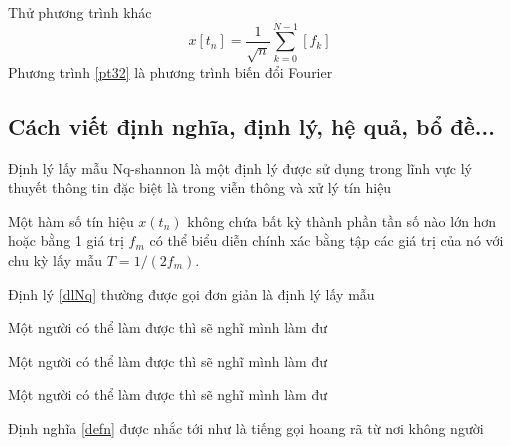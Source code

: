 Thử phương trình khác 
\begin{equation}
    \label{pt32}
    x[t_n] = \frac{1}{\sqrt{n}} \sum_{k=0}^{N-1}[f_k]
\end{equation}
Phương trình \ref{pt32} là phương trình biến đổi Fourier
\subsection{Cách viết định nghĩa, định lý, hệ quả, bổ đề...}
Định lý lấy mẫu Nq-shannon là một định lý được sử dụng trong lĩnh vực lý thuyết thông tin đặc biệt là trong viễn thông và xử lý tín hiệu 
\begin{theorem} %
    \label{dlNq}
    Một hàm số tín hiệu  $x(t_n)$ không chứa bất kỳ thành phần tần số nào lớn hơn hoặc bằng 1 giá trị $f_m$ có thể biểu diễn chính xác bằng tập các giá trị của nó với chu kỳ lấy mẫu $T = 1/(2f_m)$.
\end{theorem}
Định lý \ref{dlNq} thường được gọi đơn giản là định lý lấy mẫu 
\begin{corollary}
    Một người có thể làm được thì sẽ nghĩ mình làm đư
\end{corollary}
\begin{lemma}
    Một người có thể làm được thì sẽ nghĩ mình làm đư
\end{lemma}
\begin{defn}
    \label{defn}
    Một người có thể làm được thì sẽ nghĩ mình làm đư
\end{defn}
Định nghĩa \ref{defn} được nhắc tới như là tiếng gọi hoang rã từ nơi không người
\cleardoublepage